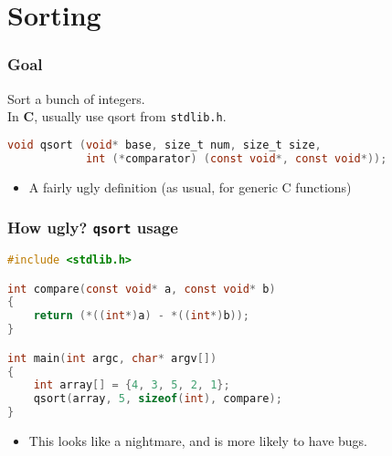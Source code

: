 \section{Sorting}
\begin{frame}[fragile]
  \frametitle{Goal}


  
  Sort a bunch of integers.\\[1em]
  In {\bf C}, usually use qsort from {\tt stdlib.h}.

  \begin{lstlisting}[language=C]
void qsort (void* base, size_t num, size_t size,
            int (*comparator) (const void*, const void*));
  \end{lstlisting}

  \begin{itemize}
    \item A fairly ugly definition (as usual, for generic C functions)
  \end{itemize}
  
\end{frame}

\begin{frame}[fragile]
  \frametitle{How ugly? {\tt qsort} usage}

  
  \begin{lstlisting}[language=C]
#include <stdlib.h>

int compare(const void* a, const void* b)
{
    return (*((int*)a) - *((int*)b));
}

int main(int argc, char* argv[])
{
    int array[] = {4, 3, 5, 2, 1};
    qsort(array, 5, sizeof(int), compare);
}
  \end{lstlisting}

  \begin{itemize}
    \item This looks like a nightmare, and is more likely to have bugs.
  \end{itemize}
  
\end{frame}

